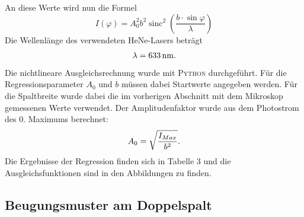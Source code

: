 \documentclass[11pt,ngerman,a4paper]{article}
\begin{document}
\noindent
An diese Werte wird nun die Formel 
\begin{equation}
I(\varphi) = A_0^2b^2\operatorname{sinc}^2\left( \frac{b\cdot\sin{\varphi}}{\lambda}\right)
\end{equation}
Die Wellenlänge des verwendeten HeNe-Lasers beträgt
\[
\lambda = \SI{633}{\nano\meter}\rm.
\] 
Die nichtlineare Ausgleichsrechnung wurde mit \textsc{Python} durchgeführt. Für die Regressionsparameter $A_0$ und $b$ müssen dabei Startwerte angegeben werden. Für die Spaltbreite wurde dabei die im vorherigen Abschnitt mit dem Mikroskop gemessenen Werte verwendet. Der Amplitudenfaktor wurde aus dem Photostrom des 0. Maximums berechnet:
\[
A_0= \sqrt{\frac{I_{Max}}{b^2}}\rm.
\] 
Die Ergebnisse der Regression finden sich in Tabelle 3 und die Ausgleichsfunktionen sind in den Abbildungen zu finden.
\subsection{Beugungsmuster am Doppelspalt}
\end{document}
